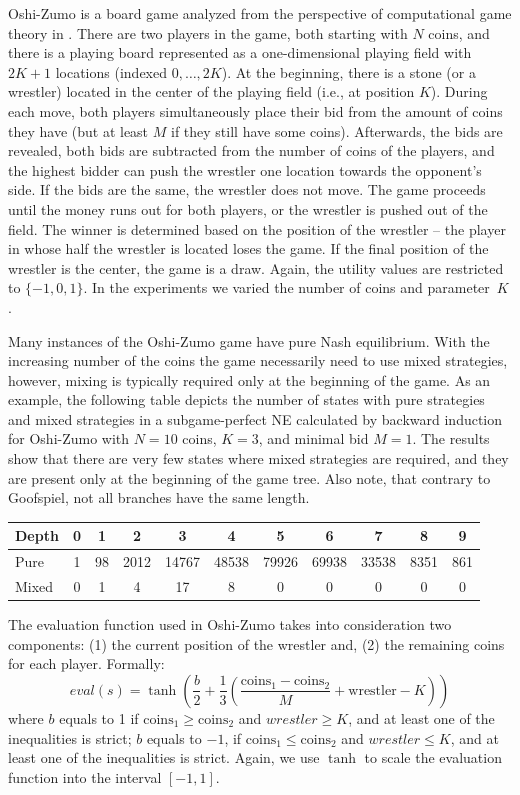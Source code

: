 Oshi-Zumo is a board game analyzed from the perspective of computational game theory in \cite{buro2003}.
There are two players in the game, both starting with $N$ coins, and there is a playing board represented as a one-dimensional playing field with $2K+1$ locations (indexed $0, \ldots, 2K$).
At the beginning, there is a stone (or a wrestler) located in the center of the playing field (i.e., at position $K$).
During each move, both players simultaneously place their bid from the amount of coins they have (but at least $M$ if they still have some coins).
Afterwards, the bids are revealed, both bids are subtracted from the number of coins of the players, and the highest bidder can push the wrestler one location towards the opponent's side.
If the bids are the same, the wrestler does not move. 
The game proceeds until the money runs out for both players, or the wrestler is pushed out of the field. 
The winner is determined based on the position of the wrestler -- the player in whose half the wrestler is located loses the game. 
If the final position of the wrestler is the center, the game is a draw.
Again, the utility values are restricted to $\lbrace -1, 0, 1 \rbrace$.
In the experiments we varied the number of coins and parameter~$K$.

Many instances of the Oshi-Zumo game have pure Nash equilibrium.
With the increasing number of the coins the game necessarily need to use mixed strategies, however, mixing is typically required only at the beginning of the game. 
As an example, the following table depicts the number of states with pure strategies and mixed strategies in a subgame-perfect NE calculated by backward induction for Oshi-Zumo with $N=10$ coins, $K=3$, and minimal bid $M=1$. The results show that there are very few states where mixed strategies are required, and they are present only at the beginning of the game tree. Also note, that contrary to Goofspiel, not all branches have the same length.

\begin{table}[h!]
\centering
\small
\begin{tabular}{|l|c|c|c|c|c|c|c|c|c|c|}
\hline Depth & 0 & 1 & 2 & 3 & 4 & 5 & 6 & 7 & 8 & 9\\
\hline Pure  & 1 & 98 & 2012 & 14767 & 48538 & 79926 & 69938 & 33538 & 8351 & 861\\
\hline Mixed & 0 &  1 &  4 &  17 & 8 & 0 & 0 & 0 & 0 & 0 \\
\hline
\end{tabular}
\end{table}
The evaluation function used in Oshi-Zumo takes into consideration two components: (1) the current position of the wrestler and, (2) the remaining coins for each player. Formally:
$$
eval(s) = \tanh\left(\frac{b}{2}+\frac{1}{3}\left(\frac{\textrm{coins}_1 - \textrm{coins}_2}{M} + \textrm{wrestler} - K\right)\right)
$$
where $b$ equals to 1 if $\textrm{coins}_1 \geq \textrm{coins}_2$ and $wrestler \geq K$, and at least one of the inequalities is strict;
$b$ equals to $-1$, if $\textrm{coins}_1 \leq \textrm{coins}_2$ and $wrestler \leq K$, and at least one of the inequalities is strict.
Again, we use $\tanh$ to scale the evaluation function into the interval $[-1,1]$.

